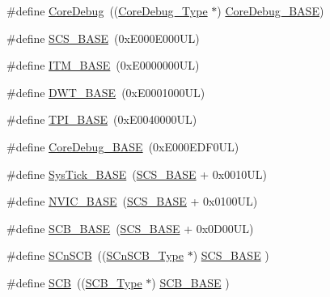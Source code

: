 \begin{DoxyCompactItemize}
\item 
\#define \hyperlink{group___c_m_s_i_s__core__base_gab6e30a2b802d9021619dbb0be7f5d63d}{Core\+Debug}~((\hyperlink{struct_core_debug___type}{Core\+Debug\+\_\+\+Type} $\ast$)     \hyperlink{group___c_m_s_i_s__core__base_ga680604dbcda9e9b31a1639fcffe5230b}{Core\+Debug\+\_\+\+B\+A\+SE})
\item 
\#define \hyperlink{group___c_m_s_i_s__core__base_ga3c14ed93192c8d9143322bbf77ebf770}{S\+C\+S\+\_\+\+B\+A\+SE}~(0x\+E000\+E000\+U\+L)
\item 
\#define \hyperlink{group___c_m_s_i_s__core__base_gadd76251e412a195ec0a8f47227a8359e}{I\+T\+M\+\_\+\+B\+A\+SE}~(0x\+E0000000\+U\+L)
\item 
\#define \hyperlink{group___c_m_s_i_s__core__base_gafdab534f961bf8935eb456cb7700dcd2}{D\+W\+T\+\_\+\+B\+A\+SE}~(0x\+E0001000\+U\+L)
\item 
\#define \hyperlink{group___c_m_s_i_s__core__base_ga2b1eeff850a7e418844ca847145a1a68}{T\+P\+I\+\_\+\+B\+A\+SE}~(0x\+E0040000\+U\+L)
\item 
\#define \hyperlink{group___c_m_s_i_s__core__base_ga680604dbcda9e9b31a1639fcffe5230b}{Core\+Debug\+\_\+\+B\+A\+SE}~(0x\+E000\+E\+D\+F0\+U\+L)
\item 
\#define \hyperlink{group___c_m_s_i_s__core__base_ga58effaac0b93006b756d33209e814646}{Sys\+Tick\+\_\+\+B\+A\+SE}~(\hyperlink{group___c_m_s_i_s__core__base_ga3c14ed93192c8d9143322bbf77ebf770}{S\+C\+S\+\_\+\+B\+A\+SE} +  0x0010\+U\+L)
\item 
\#define \hyperlink{group___c_m_s_i_s__core__base_gaa0288691785a5f868238e0468b39523d}{N\+V\+I\+C\+\_\+\+B\+A\+SE}~(\hyperlink{group___c_m_s_i_s__core__base_ga3c14ed93192c8d9143322bbf77ebf770}{S\+C\+S\+\_\+\+B\+A\+SE} +  0x0100\+U\+L)
\item 
\#define \hyperlink{group___c_m_s_i_s__core__base_gad55a7ddb8d4b2398b0c1cfec76c0d9fd}{S\+C\+B\+\_\+\+B\+A\+SE}~(\hyperlink{group___c_m_s_i_s__core__base_ga3c14ed93192c8d9143322bbf77ebf770}{S\+C\+S\+\_\+\+B\+A\+SE} +  0x0\+D00\+U\+L)
\item 
\#define \hyperlink{group___c_m_s_i_s__core__base_ga9fe0cd2eef83a8adad94490d9ecca63f}{S\+Cn\+S\+CB}~((\hyperlink{struct_s_cn_s_c_b___type}{S\+Cn\+S\+C\+B\+\_\+\+Type}    $\ast$)     \hyperlink{group___c_m_s_i_s__core__base_ga3c14ed93192c8d9143322bbf77ebf770}{S\+C\+S\+\_\+\+B\+A\+SE}      )
\item 
\#define \hyperlink{group___c_m_s_i_s__core__base_gaaaf6477c2bde2f00f99e3c2fd1060b01}{S\+CB}~((\hyperlink{struct_s_c_b___type}{S\+C\+B\+\_\+\+Type}       $\ast$)     \hyperlink{group___c_m_s_i_s__core__base_gad55a7ddb8d4b2398b0c1cfec76c0d9fd}{S\+C\+B\+\_\+\+B\+A\+SE}      )

\end{DoxyCompactItemize}
